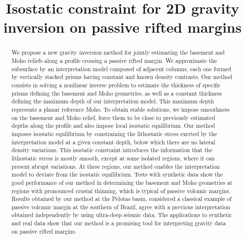 \documentclass[manuscript]{geophysics}
\begin{document}
\title{Isostatic constraint for 2D gravity inversion on passive rifted margins}

\renewcommand{\thefootnote}{\fnsymbol{footnote}} 




\maketitle

\begin{abstract}

We propose a new gravity inversion method for jointly estimating the basement and 
Moho reliefs along a profile crossing a passive rifted margin.
We approximate the subsurface by an interpretation model composed of 
adjacent columns, each one formed by vertically stacked prisms having constant 
and known density contrasts.
Our method consists in solving a nonlinear inverse problem to estimate the 
thickness of specific prisms defining the basement and Moho geometries, 
as well as a constant thickness defining the maximum depth of our interpretation 
model.
This maximum depth represents a planar reference Moho.
To obtain stable solutions, we impose smoothness on the basement and Moho relief,
force them to be close to previously estimated depths along the profile and also 
impose local isostatic equilibrium.
Our method imposes isostatic equilibrium by constraining the lithostatic stress 
exerted by the interpretation model at a given constant depth, 
below which there are no lateral density variations.
This isostatic constraint introduces the information that the lithostatic stress 
is mostly smooth, except at some isolated regions, where it can present abrupt 
variations. At these regions, our method enables the interpretation model to deviate
from the isostatic equilibrium.
Tests with synthetic data show the good performance of our method in
determining the basement and Moho geometries at regions with  
pronounced crustal thinning, which is typical of passive volcanic margins.
Results obtained by our method at the Pelotas basin, considered a classical example
of passive volcanic margin at the southern of Brazil, agree with a previous
interpretation obtained independently by using ultra-deep seismic data.
The applications to synthetic and real data show that our method is a
promising tool for interpreting gravity data on passive rifted margins.


\end{abstract}
\end{document}
